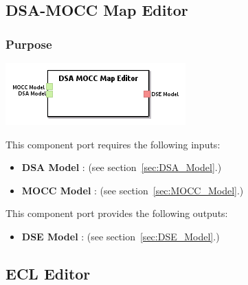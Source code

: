 \documentclass{gemoc} %
\begin{document}
\subsection{DSA-MOCC Map Editor}
\label{sec:DSA-MOCC_Map_Editor}


\subsubsection{Purpose}


\begin{center}
\includegraphics*[trim=0.0cm 0.0cm 0cm 0.0cm, clip=true]{../images/generated/Generated_DSA-MOCC_Map_Editor.png}
\end{center}

This component port requires the following inputs:
\begin{itemize}
  \item \textbf{DSA Model} :
(see section~\ref{sec:DSA_Model}.)
  \item \textbf{MOCC Model} :
(see section~\ref{sec:MOCC_Model}.)
\end{itemize}

This component port provides the following outputs:
\begin{itemize}
  \item \textbf{DSE Model} :
(see section~\ref{sec:DSE_Model}.)
\end{itemize}


\subsection{ECL Editor}
\label{sec:ECL_Editor}
\end{document}

